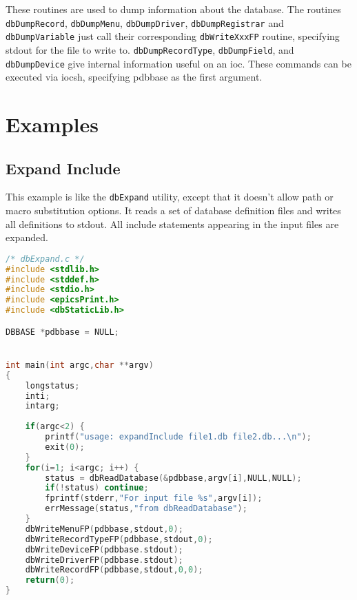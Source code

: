 These routines are used to dump information about the database.
The routines \verb|dbDumpRecord|, \verb|dbDumpMenu|, \verb|dbDumpDriver|, \verb|dbDumpRegistrar| and \verb|dbDumpVariable| just call their corresponding \verb|dbWriteXxxFP| routine, specifying stdout for the file to write to.
\verb|dbDumpRecordType|, \verb|dbDumpField|, and \verb|dbDumpDevice| give internal information useful on an ioc.
These commands can be executed via iocsh, specifying pdbbase as the first argument.

\section{Examples}

\subsection{Expand Include}

This example is like the \verb|dbExpand| utility, except that it doesn't allow path or macro substitution options.
It reads a set of database definition files and writes all definitions to stdout.
All include statements appearing in the input files are expanded.

\begin{lstlisting}[language=C]
/* dbExpand.c */
#include <stdlib.h>
#include <stddef.h>
#include <stdio.h>
#include <epicsPrint.h>
#include <dbStaticLib.h>

DBBASE *pdbbase = NULL;


int main(int argc,char **argv)
{
    longstatus;
    inti;
    intarg;
 
    if(argc<2) {
        printf("usage: expandInclude file1.db file2.db...\n");
        exit(0);
    }
    for(i=1; i<argc; i++) {
        status = dbReadDatabase(&pdbbase,argv[i],NULL,NULL);
        if(!status) continue;
        fprintf(stderr,"For input file %s",argv[i]);
        errMessage(status,"from dbReadDatabase");
    }
    dbWriteMenuFP(pdbbase,stdout,0);
    dbWriteRecordTypeFP(pdbbase,stdout,0);
    dbWriteDeviceFP(pdbbase.stdout);
    dbWriteDriverFP(pdbbase.stdout);
    dbWriteRecordFP(pdbbase,stdout,0,0);
    return(0);
}

\end{lstlisting}

